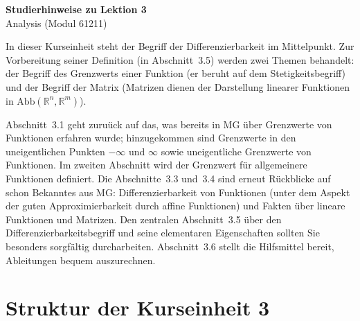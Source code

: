 \documentclass[a4paper,12pt]{article}
\begin{document}
\begin{center}
  {\LARGE\bfseries Studierhinweise zu Lektion 3}\\[0.5em]
  {\large Analysis (Modul 61211)}
\end{center}

\vspace{1em}

In dieser Kurseinheit steht der Begriff der Differenzierbarkeit im Mittelpunkt.
Zur Vorbereitung seiner Definition (in Abschnitt~3.5) werden zwei Themen
behandelt: der Begriff des Grenzwerts einer Funktion (er beruht auf dem
Stetigkeitsbegriff) und der Begriff der Matrix (Matrizen dienen der Darstellung
linearer Funktionen in $\mathrm{Abb}(\mathbb{R}^n, \mathbb{R}^m)$).

Abschnitt~3.1 geht zuru\"uck auf das, was bereits in MG \"uber Grenzwerte von
Funktionen erfahren wurde; hinzugekommen sind Grenzwerte in den uneigentlichen
Punkten $-\infty$ und $\infty$ sowie uneigentliche Grenzwerte von Funktionen.
Im zweiten Abschnitt wird der Grenzwert f\"ur allgemeinere Funktionen definiert.
Die Abschnitte~3.3 und~3.4 sind erneut R\"uckblicke auf schon Bekanntes aus MG:
Differenzierbarkeit von Funktionen (unter dem Aspekt der guten Approximierbarkeit
durch affine Funktionen) und Fakten \"uber lineare Funktionen und Matrizen.
Den zentralen Abschnitt~3.5 \"uber den Differenzierbarkeitsbegriff und seine
elementaren Eigenschaften sollten Sie besonders sorgf\"altig durcharbeiten.
Abschnitt~3.6 stellt die Hilfsmittel bereit, Ableitungen bequem auszurechnen.

\section*{Struktur der Kurseinheit 3}
\end{document}
